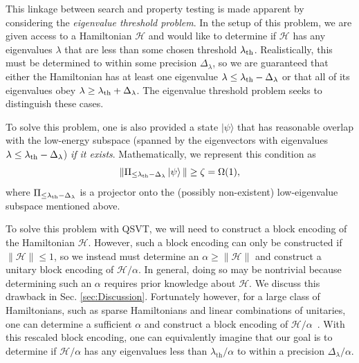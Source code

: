 \documentclass[aps,pra,showpacs,notitlepage,twocolumn,superscriptaddress,nofootinbib]{revtex4-1}
\begin{document}
    This linkage between search and property testing is made apparent by considering the \emph{eigenvalue threshold problem}. In the setup of this problem, we are given access to a Hamiltonian $\mathcal{H}$ and would like to determine if $\mathcal{H}$ has any eigenvalues $\lambda$ that are less than some chosen threshold $\lambda_{\rm th}$. Realistically, this must be determined to within some precision $\Delta_\lambda$, so we are guaranteed that either the Hamiltonian has at least one eigenvalue $\lambda \leq \lambda_{\rm th} - \Delta_\lambda$ or that all of its eigenvalues obey $\lambda \geq \lambda_{\rm th} + \Delta_\lambda$. The eigenvalue threshold problem seeks to distinguish these cases. 
    
    To solve this problem, one is also provided a state $|\psi\rangle$ that has reasonable overlap with the low-energy subspace (spanned by the eigenvectors with eigenvalues $\lambda \leq \lambda_{\rm th} - \Delta_\lambda$) \emph{if it exists}. Mathematically, we represent this condition as
    \begin{equation}
        \| \Pi_{\leq \lambda_{\rm th} - \Delta_\lambda } \ket{\psi} \| \geq \zeta = \Omega(1),
    \end{equation}
    where $\Pi_{\leq \lambda_{\rm th} - \Delta_\lambda}$ is a projector onto the (possibly non-existent) low-eigenvalue subspace mentioned above. 
    
    To solve this problem with QSVT, we will need to construct a block encoding of the Hamiltonian $\mathcal{H}$. However, such a block encoding can only be constructed if $\|\mathcal{H}\| \leq 1$, so we instead must determine an $\alpha \geq \| \mathcal{H}\|$ and construct a unitary block encoding of $\mathcal{H}/\alpha$. In general, doing so may be nontrivial because determining such an $\alpha$ requires prior knowledge about $\mathcal{H}$. We discuss this drawback in Sec. \ref{sec:Discussion}. Fortunately however, for a large class of Hamiltonians, such as sparse Hamiltonians and linear combinations of unitaries, one can determine a sufficient $\alpha$ and construct a block encoding of $\mathcal{H}/\alpha$~\cite{Low_2019, Gily_n_2019}. With this rescaled block encoding, one can equivalently imagine that our goal is to determine if $\mathcal{H}/\alpha$ has any eigenvalues less than $\lambda_{\text{th}}/\alpha$ to within a precision $\Delta_\lambda/\alpha$.
    
\end{document}
